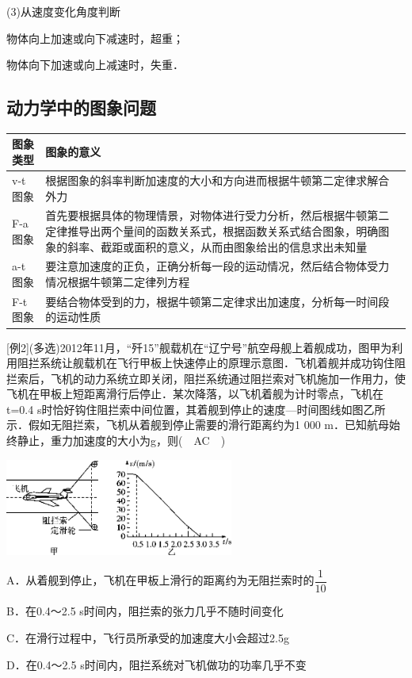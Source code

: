 \documentclass[cn,10.5pt,chinese,mac,chinesefont=founder]{elegantbook}
\begin{document}
(3)从速度变化角度判断

物体向上加速或向下减速时，超重；

物体向下加速或向上减速时，失重．
\newpage
\subsection{动力学中的图象问题}

\begin{longtable}[]{@{}m{2cm}m{13cm}@{}}
\toprule
图象类型 & 图象的意义\tabularnewline
\midrule
\endhead
v-t图象 &
根据图象的斜率判断加速度的大小和方向进而根据牛顿第二定律求解合外力\tabularnewline
F-a图象 &
首先要根据具体的物理情景，对物体进行受力分析，然后根据牛顿第二定律推导出两个量间的函数关系式，根据函数关系式结合图象，明确图象的斜率、截距或面积的意义，从而由图象给出的信息求出未知量\tabularnewline
a-t图象 &
要注意加速度的正负，正确分析每一段的运动情况，然后结合物体受力情况根据牛顿第二定律列方程\tabularnewline
F-t图象 &
要结合物体受到的力，根据牛顿第二定律求出加速度，分析每一时间段的运动性质\tabularnewline
\bottomrule
\end{longtable}

{[}例2{]}(多选)2012年11月，``歼15''舰载机在``辽宁号''航空母舰上着舰成功，图甲为利用阻拦系统让舰载机在飞行甲板上快速停止的原理示意图．飞机着舰并成功钩住阻拦索后，飞机的动力系统立即关闭，阻拦系统通过阻拦索对飞机施加一作用力，使飞机在甲板上短距离滑行后停止．某次降落，以飞机着舰为计时零点，飞机在t=0.4
s时恰好钩住阻拦索中间位置，其着舰到停止的速度---时间图线如图乙所示．假如无阻拦索，飞机从着舰到停止需要的滑行距离约为1
000 m．已知航母始终静止，重力加速度的大小为g，则(　AC　)

\begin{center}\includegraphics[width=2.95833in,height=1.25in]{media/image117.png}\end{center}

A．从着舰到停止，飞机在甲板上滑行的距离约为无阻拦索时的$\dfrac{1}{10}$

B．在0.4～2.5 s时间内，阻拦索的张力几乎不随时间变化

C．在滑行过程中，飞行员所承受的加速度大小会超过2.5g

D．在0.4～2.5 s时间内，阻拦系统对飞机做功的功率几乎不变
\end{document}
